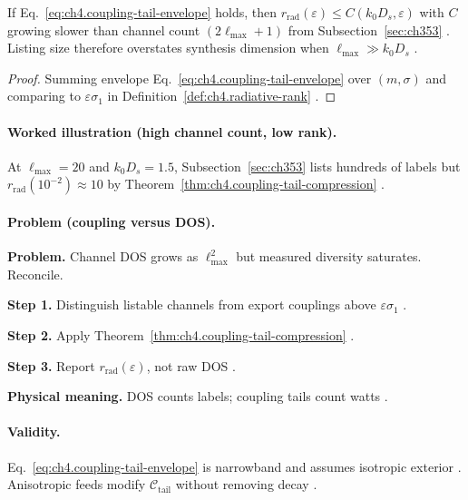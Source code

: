 \begin{theorem}
\label{thm:ch4.coupling-tail-compression}
If Eq.~\eqref{eq:ch4.coupling-tail-envelope} holds, then
\(r_{\mathrm{rad}}(\varepsilon)\le C(k_{0}D_{s},\varepsilon)\) with \(C\) growing slower than channel count
\((2\ell_{\max}+1)\) from Subsection~\ref{sec:ch353} \cite{hansen1988,stratton1941,harrington2001}. Listing size therefore
overstates synthesis dimension when \(\ell_{\max}\gg k_{0}D_{s}\) \cite{devaney2004}.
\end{theorem}
\begin{proof}
Summing envelope Eq.~\eqref{eq:ch4.coupling-tail-envelope} over \((m,\sigma)\) and comparing to \(\varepsilon\sigma_{1}\) in
Definition~\ref{def:ch4.radiative-rank} \cite{hansen1988,harrington2001,stratton1941}.
\end{proof}

\paragraph{Worked illustration (high channel count, low rank).}
At \(\ell_{\max}=20\) and \(k_{0}D_{s}=1.5\), Subsection~\ref{sec:ch353} lists hundreds of labels but
\(r_{\mathrm{rad}}(10^{-2})\approx10\) by Theorem~\ref{thm:ch4.coupling-tail-compression} \cite{hansen1988,harrington2001,devaney2004}.

\paragraph{Problem (coupling versus DOS).}
\textbf{Problem.} Channel DOS grows as \(\ell_{\max}^{2}\) but measured diversity saturates. Reconcile.

\textbf{Step 1.} Distinguish listable channels from export couplings above \(\varepsilon\sigma_{1}\) \cite{hansen1988,stratton1941}.

\textbf{Step 2.} Apply Theorem~\ref{thm:ch4.coupling-tail-compression} \cite{harrington2001,devaney2004}.

\textbf{Step 3.} Report \(r_{\mathrm{rad}}(\varepsilon)\), not raw DOS \cite{jackson1999}.

\textbf{Physical meaning.} DOS counts labels; coupling tails count watts \cite{hansen1988}.

\paragraph{Validity.}
Eq.~\eqref{eq:ch4.coupling-tail-envelope} is narrowband and assumes isotropic exterior \cite{stratton1941}. Anisotropic feeds modify
\(\mathcal{C}_{\mathrm{tail}}\) without removing decay \cite{harrington2001}.


